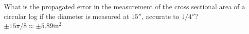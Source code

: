 {What is the propagated error in the measurement of the cross sectional area of a circular log if the diameter is measured at $15''$, accurate to $1/4''$?
}
{$\pm15\pi/8 \approx \pm5.89$in$^2$
}

